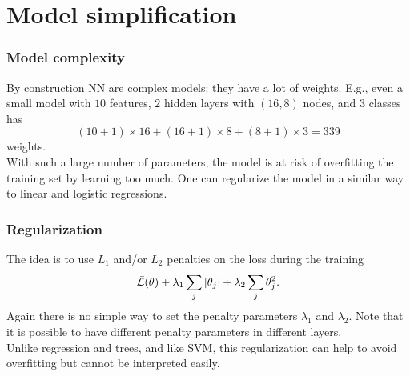 \section{Model simplification}
\begin{frame}
\frametitle{Model complexity}
By construction NN are complex models: they have a lot of weights. E.g., even a small model with $10$ features, $2$ hidden layers with $(16,8)$ nodes, and 3 classes has 
$$
(10+1)\times 16 + (16+1)\times 8 + (8+1)\times 3 = 339
$$
weights. \\
\vspace{0.3cm}
With such a large number of parameters, the model is at risk of overfitting the training set by learning too much. One can regularize the model in a similar way to linear and logistic regressions.
\end{frame}
\begin{frame}
\frametitle{Regularization}
The idea is to use $L_1$ and/or $L_2$ penalties on the loss during the training
$$
\bar{\cal L}(\theta) + \lambda_1 \sum_{j} |\theta_j| + \lambda_2 \sum_{j} \theta_j^2.
$$ 
Again there is no simple way to set the penalty parameters $\lambda_1$ and $\lambda_2$. Note that it is possible to have different penalty parameters in different layers.\\
\vspace{0.3cm}
Unlike regression and trees, and like SVM, this regularization can help to avoid overfitting but cannot be interpreted easily. 
\end{frame}



